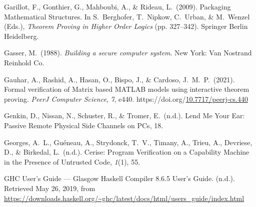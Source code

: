 \documentclass[12pt,twoside]{article}
\begin{document}
{\begin{thebibliography}{1079}
\mdbibitemlabel{}Garillot, F., Gonthier, G., Mahboubi, A., \& Rideau, L.~(2009). Packaging Mathematical Structures. In S.~Berghofer, T.~Nipkow, C.~Urban, \& M.~Wenzel (Eds.), \emph{Theorem Proving in Higher Order Logics} (pp. 327–342). Springer Berlin Heidelberg.%

\mdbibitemlabel{}Gasser, M.~(1988). \emph{Building a secure computer system}. New York: Van Nostrand Reinhold Co.%

\mdbibitemlabel{}Gauhar, A., Rashid, A., Hasan, O., Bispo, J., \& Cardoso, J.~M.~P.~(2021). Formal verification of Matrix based MATLAB models using interactive theorem proving. \emph{PeerJ Computer Science}, \emph{7}, e440. https://doi.org/\href{https://dx.doi.org/10.7717/peerj-cs.440}{10.7717/peerj-cs.440}%

\mdbibitemlabel{}Genkin, D., Nissan, N., Schuster, R., \& Tromer, E.~(n.d.). Lend Me Your Ear: Passive Remote Physical Side Channels on PCs, 18.%

\mdbibitemlabel{}Georges, A.~L., Guéneau, A., Strydonck, T.~V., Timany, A., Trieu, A., Devriese, D., \& Birkedal, L.~(n.d.). Cerise: Program Verification on a Capability Machine in the Presence of Untrusted Code, \emph{1}(1), 55.%

\mdbibitemlabel{}GHC User’s Guide — Glasgow Haskell Compiler 8.6.5 User's Guide. (n.d.). Retrieved May 26, 2019, from \href{https://downloads.haskell.org/~ghc/latest/docs/html/users_guide/index.html}{{\ttfamily https://\hspace{0pt}downloads.\hspace{0pt}haskell.\hspace{0pt}org/\hspace{0pt}\textasciitilde{}ghc/\hspace{0pt}latest/\hspace{0pt}docs/\hspace{0pt}html/\hspace{0pt}users\_\hspace{0pt}guide/\hspace{0pt}index.\hspace{0pt}html}}%


\end{thebibliography}}
\end{document}
